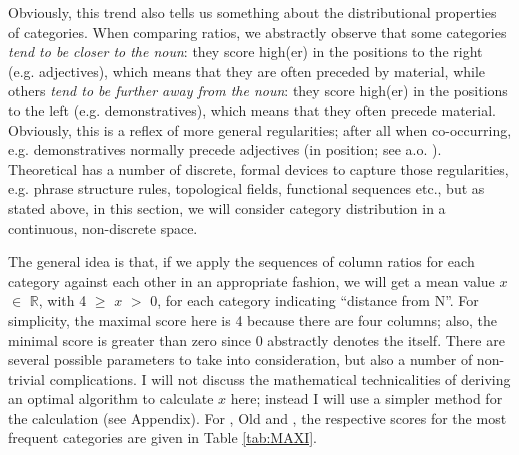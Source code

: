 \documentclass[output=paper,colorlinks,citecolor=brown,draft]{langscibook}
\begin{document}
Obviously, this trend also tells us something about the distributional properties of categories. When comparing ratios, we abstractly observe that some categories \textit{tend to be closer to the noun}: they score  high(er) in the positions to the right (e.g. adjectives), which means that they are often preceded by material,  while others \textit{tend to be further away from the noun}: they score high(er) in the positions to the left (e.g. demonstratives), which means that they often precede material. Obviously, this is a reflex of more general  regularities; after all when co-occurring, e.g. demonstratives normally precede adjectives (in  position; see a.o. \citealt{Cinque2005U20}).     
Theoretical  has a number of discrete, formal devices to capture those regularities, e.g. phrase structure rules, topological fields,  functional sequences etc., but as stated above, in this section, we will consider category distribution in a continuous, non-discrete space.


The general idea is that, if we apply the sequences of column ratios for each category  against each other in an appropriate fashion, we will get a mean value $x$ $\in$ $\mathbb{R}$, with 4 $\geq$ $x$  $>$ 0, for each category indicating ``distance from N''. For simplicity, the maximal score here is 4 because there are four columns; also, the minimal score is greater than zero since 0 abstractly denotes the  itself.  There are several possible parameters to take into consideration, but also a number of non-trivial complications.  I will not discuss the mathematical technicalities of deriving an optimal algorithm to calculate $x$ here; instead I will use a simpler method for the calculation (see Appendix). 
For , Old  and ,  the respective scores for the most frequent categories are given in Table \ref{tab:MAXI}. 
\end{document}
